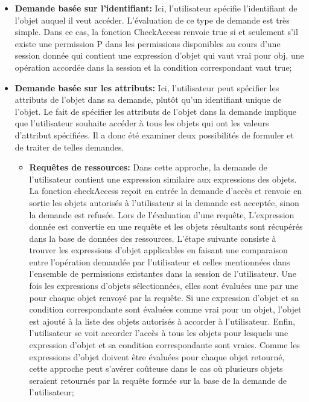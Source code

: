 \begin{itemize}
\item \textbf{Demande basée sur l'identifiant:} Ici, l'utilisateur spécifie l'identifiant de l'objet auquel il veut accéder. L'évaluation de ce type de demande est très simple. Dans ce cas, la fonction CheckAccess renvoie true si et seulement s'il existe une permission P dans les permissions disponibles au cours d'une session donnée qui contient une expression d'objet qui vaut vrai pour obj, une opération accordée dans la session et la condition correspondant vaut true;
\item \textbf{Demande basée sur les attributs:} Ici, l'utilisateur peut spécifier les attributs de l'objet dans sa demande, plutôt qu'un identifiant unique de l'objet.  Le fait de spécifier les attributs de l'objet dans la demande implique que l'utilisateur souhaite accéder à tous les objets qui ont les valeurs d'attribut spécifiées. Il a donc été examiner deux possibilités de formuler et de traiter de telles demandes.
\begin{itemize}
\item \textbf{Requêtes de ressources:} Dans cette approche, la demande de l'utilisateur contient une expression similaire aux expressions des objets. La fonction checkAccess reçoit en entrée la demande d'accès et renvoie en sortie les objets autorisés à l'utilisateur si la demande est acceptée, sinon la demande est refusée. Lors de l'évaluation d'une requête, L'expression donnée est convertie en une requête et les objets résultants sont récupérés dans la base de données des ressources. L'étape suivante consiste à trouver les expressions d'objet applicables en faisant une comparaison entre l'opération demandée par l'utilisateur et celles mentionnées dans l'ensemble de permissions existantes dans la session de l'utilisateur. Une fois les expressions d'objets sélectionnées, elles sont évaluées une par une pour chaque objet renvoyé par la requête. Si une expression d'objet et sa condition correspondante sont évaluées comme vrai pour un objet, l'objet est ajouté à la liste des objets autorisés à accorder à l'utilisateur. Enfin, l'utilisateur se voit accorder l'accès à tous les objets pour lesquels une expression d'objet et sa condition correspondante sont vraies. Comme les expressions d'objet doivent être évaluées pour chaque objet retourné, cette approche peut s'avérer coûteuse dans le cas où plusieurs objets seraient retournés par la requête formée sur la base de la demande de l'utilisateur;

\end{itemize}
\end{itemize}
